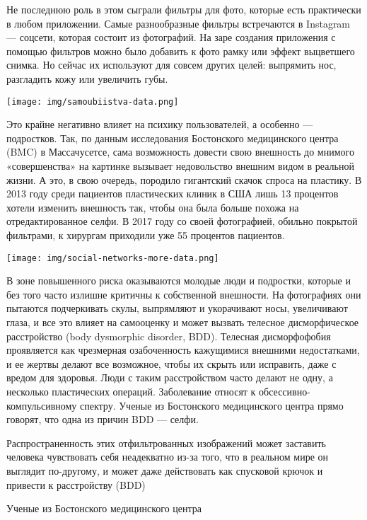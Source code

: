 Не последнюю роль в этом сыграли фильтры для фото, которые есть практически в любом приложении. Самые разнообразные фильтры встречаются в Instagram — соцсети, которая состоит из фотографий. На заре создания приложения с помощью фильтров можно было добавить к фото рамку или эффект выцветшего снимка. Но сейчас их используют для совсем других целей: выпрямить нос, разгладить кожу или увеличить губы.

\begin{center}
    \texttt{[image: img/samoubiistva-data.png]}
\end{center}

Это крайне негативно влияет на психику пользователей, а особенно — подростков. Так, по данным исследования Бостонского медицинского центра (BMC) в Массачусетсе, сама возможность довести свою внешность до мнимого «совершенства» на картинке вызывает недовольство внешним видом в реальной жизни. А это, в свою очередь, породило гигантский скачок спроса на пластику. В 2013 году среди пациентов пластических клиник в США лишь 13 процентов хотели изменить внешность так, чтобы она была больше похожа на отредактированное селфи. В 2017 году со своей фотографией, обильно покрытой фильтрами, к хирургам приходили уже 55 процентов пациентов.

\begin{center}
    \texttt{[image: img/social-networks-more-data.png]}
\end{center}

В зоне повышенного риска оказываются молодые люди и подростки, которые и без того часто излишне критичны к собственной внешности. На фотографиях они пытаются подчеркивать скулы, выпрямляют и укорачивают носы, увеличивают глаза, и все это влияет на самооценку и может вызвать телесное дисморфическое расстройство (body dysmorphic disorder, BDD). Телесная дисморфофобия проявляется как чрезмерная озабоченность кажущимися внешними недостатками, и ее жертвы делают все возможное, чтобы их скрыть или исправить, даже с вредом для здоровья. Люди с таким расстройством часто делают не одну, а несколько пластических операций. Заболевание относят к обсессивно-компульсивному спектру. Ученые из Бостонского медицинского центра прямо говорят, что одна из причин BDD — селфи.

\begin{fancyquotes}
    Распространенность этих отфильтрованных изображений может заставить человека чувствовать себя неадекватно из-за того, что в реальном мире он выглядит по-другому, и может даже действовать как спусковой крючок и привести к расстройству (BDD)

    \begin{flushright}
        Ученые из Бостонского медицинского центра
    \end{flushright}
\end{fancyquotes}

